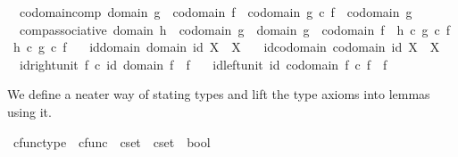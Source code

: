 \begin{isabellebody}
\ \ codomain{\isacharunderscore}{\kern0pt}comp{\isacharcolon}{\kern0pt}\ {\isachardoublequoteopen}domain\ g\ {\isacharequal}{\kern0pt}\ codomain\ f\ {\isasymLongrightarrow}\ codomain\ {\isacharparenleft}{\kern0pt}g\ {\isasymcirc}\isactrlsub c\ f{\isacharparenright}{\kern0pt}\ {\isacharequal}{\kern0pt}\ codomain\ g{\isachardoublequoteclose}\ \isanewline
\ \ comp{\isacharunderscore}{\kern0pt}associative{\isacharcolon}{\kern0pt}\ {\isachardoublequoteopen}domain\ h\ {\isacharequal}{\kern0pt}\ codomain\ g\ {\isasymLongrightarrow}\ domain\ g\ {\isacharequal}{\kern0pt}\ codomain\ f\ {\isasymLongrightarrow}\ h\ {\isasymcirc}\isactrlsub c\ {\isacharparenleft}{\kern0pt}g\ {\isasymcirc}\isactrlsub c\ f{\isacharparenright}{\kern0pt}\ {\isacharequal}{\kern0pt}\ {\isacharparenleft}{\kern0pt}h\ {\isasymcirc}\isactrlsub c\ g{\isacharparenright}{\kern0pt}\ {\isasymcirc}\isactrlsub c\ f{\isachardoublequoteclose}\ \isanewline
\ \ id{\isacharunderscore}{\kern0pt}domain{\isacharcolon}{\kern0pt}\ {\isachardoublequoteopen}domain\ {\isacharparenleft}{\kern0pt}id\ X{\isacharparenright}{\kern0pt}\ {\isacharequal}{\kern0pt}\ X{\isachardoublequoteclose}\ \isanewline
\ \ id{\isacharunderscore}{\kern0pt}codomain{\isacharcolon}{\kern0pt}\ {\isachardoublequoteopen}codomain\ {\isacharparenleft}{\kern0pt}id\ X{\isacharparenright}{\kern0pt}\ {\isacharequal}{\kern0pt}\ X{\isachardoublequoteclose}\ \isanewline
\ \ id{\isacharunderscore}{\kern0pt}right{\isacharunderscore}{\kern0pt}unit{\isacharcolon}{\kern0pt}\ {\isachardoublequoteopen}f\ {\isasymcirc}\isactrlsub c\ id\ {\isacharparenleft}{\kern0pt}domain\ f{\isacharparenright}{\kern0pt}\ {\isacharequal}{\kern0pt}\ f{\isachardoublequoteclose}\ \isanewline
\ \ id{\isacharunderscore}{\kern0pt}left{\isacharunderscore}{\kern0pt}unit{\isacharcolon}{\kern0pt}\ {\isachardoublequoteopen}id\ {\isacharparenleft}{\kern0pt}codomain\ f{\isacharparenright}{\kern0pt}\ {\isasymcirc}\isactrlsub c\ f\ {\isacharequal}{\kern0pt}\ f{\isachardoublequoteclose}%
\begin{isamarkuptext}%
We define a neater way of stating types and lift the type axioms into lemmas using it.%
\end{isamarkuptext}\isamarkuptrue%
\isamarkupfalse%
\ cfunc{\isacharunderscore}{\kern0pt}type\ {\isacharcolon}{\kern0pt}{\isacharcolon}{\kern0pt}\ {\isachardoublequoteopen}cfunc\ {\isasymRightarrow}\ cset\ {\isasymRightarrow}\ cset\ {\isasymRightarrow}\ bool{\isachardoublequoteclose}\ {\isacharparenleft}{\kern0pt}{\isachardoublequoteopen}{\isacharunderscore}{\kern0pt}\ {\isacharcolon}{\kern0pt}\ {\isacharunderscore}{\kern0pt}\ {\isasymrightarrow}\ {\isacharunderscore}{\kern0pt}{\isachardoublequoteclose}\ {\isacharbrackleft}{\kern0pt}{}{}{\isacharcomma}{\kern0pt}\ {}{}{\isacharcomma}{\kern0pt}\ {}{}{\isacharbrackright}{\kern0pt}{}{}{\isacharparenright}{\kern0pt}\ \isanewline

\end{isabellebody}
